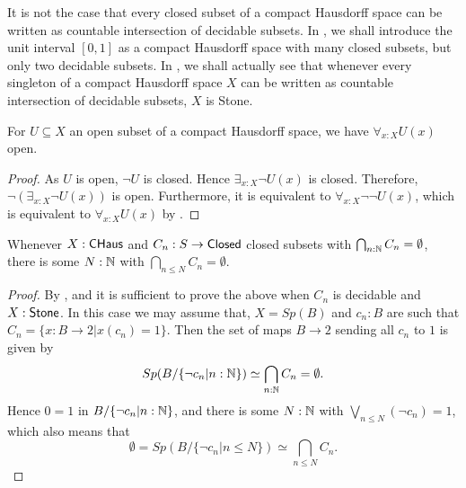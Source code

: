\begin{remark}
  It is not the case that every closed subset of a compact Hausdorff space can be written 
  as countable intersection of decidable subsets. 
  In , we shall introduce the unit interval $[0,1]$ as a compact Hausdorff space with many closed 
  subsets, but only two decidable subsets. 
  In , we shall actually see that whenever every singleton of a compact Hausdorff space $X$
  can be written as countable intersection of decidable subsets, $X$ is Stone. 
\end{remark}


\begin{corollary}\label{AllOpenSubspaceOpen}
  For $U\subseteq X$ an open subset of a compact Hausdorff space, we have 
  $\forall_{x:X} U(x)$ open. 
\end{corollary}
\begin{proof}
  As $U$ is open, $\neg U$ is closed. 
  Hence $\exists_{x:X} \neg U(x)$ is closed. 
  Therefore, $\neg (\exists_{x:X} \neg U(x))$ is open. 
  Furthermore, it is equivalent to $\forall_{x:X} \neg \neg U(x)$, 
  which is equivalent to $\forall_{x:X} U(x)$ by .
\end{proof}

\begin{lemma}\label{CHausFiniteIntersectionProperty}
  Whenever $X:\mathsf{CHaus}$ and $C_n:S\to \mathsf{Closed}$ closed subsets with $\bigcap_{n:\mathbb{N}} C_n =\emptyset$, there is some $N:\mathbb{N}$ 
  with $\bigcap_{n\leq N} C_n  = \emptyset$. 
\end{lemma}
\begin{proof}
  By , and  
  it is sufficient to prove the above when $C_n$ is decidable and $X:\mathsf{Stone}$.
  In this case we may assume that, 
  $X=Sp(B)$ and $c_n:B$ are such that $C_n = \{x:B\to 2 | x(c_n) = 1\}$. 
  Then the set of maps $B\to 2$ sending all $c_n$ to $1$ is given by 
  $$Sp(B/\{\neg c_n |n:\mathbb{N}\}) \simeq \bigcap_{n:\mathbb{N}} C_n = \emptyset .$$
  Hence 
  $0=1$ in $B/\{\neg c_n|{n:\mathbb{N}}\}$, and there is some $N:\mathbb{N}$ with 
  $\bigvee_{n\leq N} (\neg c_n) = 1$, which also means that 
  $$\emptyset = Sp(B/\{ \neg c_n| n \leq N\})  \simeq \bigcap_{n\leq N} C_n .$$
\end{proof}

